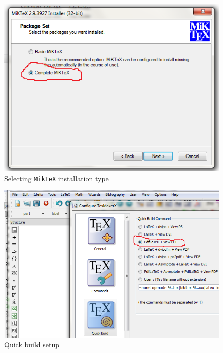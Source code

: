 \documentclass[12pt,a4paper]{article}
\begin{document}
\begin{figure}[H]
\centering
\includegraphics[scale=1.0]{MiKTeXComplete.png}
\caption{Selecting \texttt{MikTeX} installation type}
\label{miktex-installation-type}
\end{figure}
\begin{figure}[H]
\centering
\includegraphics[scale=0.8]{QuickBuildSetup.png}
\caption{Quick build setup}
\label{quickbuild-setup}
\end{figure}
\end{document}
